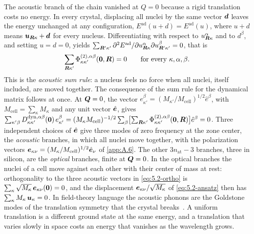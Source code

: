 The acoustic branch of the chain vanished at $Q = 0$ because a rigid translation costs no energy. In every crystal, displacing all nuclei by the same vector $\bm{d}$ leaves the energy unchanged at any configuration, $E^{\mathrm{ad}}(u + d) = E^{\mathrm{ad}}(u)$, where $u + d$ means $\bm{u}_{\bm{R}\kappa} + \bm{d}$ for every nucleus. Differentiating with respect to $u^\alpha_{\bm{R}\kappa}$ and to $d^\beta$, and setting $u = d = 0$, yields $\sum_{\bm{R}'\kappa'}\partial^2E^{\mathrm{ad}}/\partial u^\alpha_{\bm{R}\kappa}\partial u^\beta_{\bm{R}'\kappa'} = 0$, that is
\begin{equation}
  \sum_{\bm{R}\kappa'}\Phi^{(2),\alpha\beta}_{\kappa\kappa'}(\bm{0},\bm{R}) = 0 \qquad \text{for every } \kappa, \alpha, \beta .
  \label{eq:5.2-asr}
\end{equation}
This is the \emph{acoustic sum rule}: a nucleus feels no force when all nuclei, itself included, are moved together. The consequence of the sum rule for the dynamical matrix follows at once. At $\bm{Q} = 0$, the vector $e^\beta_{\kappa'} = (M_{\kappa'}/M_{\mathrm{cell}})^{1/2}\hat e^\beta$, with $M_{\mathrm{cell}} = \sum_\kappa M_\kappa$ and any unit vector $\hat{\bm{e}}$, gives $\sum_{\kappa'\beta}D^{\mathrm{dyn},\alpha\beta}_{\kappa\kappa'}(\bm{0})\,e^\beta_{\kappa'} = (M_\kappa M_{\mathrm{cell}})^{-1/2}\sum_\beta\bigl[\sum_{\bm{R}\kappa'}\Phi^{(2),\alpha\beta}_{\kappa\kappa'}(\bm{0},\bm{R})\bigr]\hat e^\beta = 0$. Three independent choices of $\hat{\bm{e}}$ give three modes of zero frequency at the zone center, the \emph{acoustic} branches, in which all nuclei move together, with the polarization vectors $\bm{e}_{\kappa\nu} = (M_\kappa/M_{\mathrm{cell}})^{1/2}\hat{\bm{e}}_\nu$ of \cref{app:A.6}. The other $3n_{\mathrm{at}} - 3$ branches, three in silicon, are the \emph{optical} branches, finite at $\bm{Q} = 0$. In the optical branches the nuclei of a cell move against each other with their center of mass at rest: orthogonality to the three acoustic vectors in \cref{eq:5.2-ortho} is $\sum_\kappa\sqrt{M_\kappa}\,\bm{e}_{\kappa\nu}(\bm{0}) = 0$, and the displacement $\bm{e}_{\kappa\nu}/\sqrt{M_\kappa}$ of \cref{eq:5.2-ansatz} then has $\sum_\kappa M_\kappa\,\bm{u}_\kappa = 0$. In field-theory language the acoustic phonons are the Goldstone modes of the translation symmetry that the crystal breaks~\cite[p.~69]{lin2019tasi}. A uniform translation is a different ground state at the same energy, and a translation that varies slowly in space costs an energy that vanishes as the wavelength grows.

